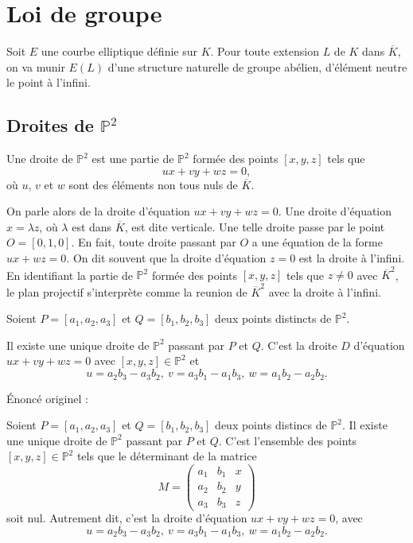 \chapter{Loi de groupe}

Soit $E$ une courbe elliptique définie sur $K$. Pour toute extension $L$ de $K$ dans $\overline{K}$, on va munir $E(L)$ d'une structure naturelle de groupe abélien, d'élément neutre le point à l'infini.

\section{Droites de $\mathbb{P}^2$}

\begin{definition}
    Une droite de $\mathbb{P}^2$ est une partie de $\mathbb{P}^2$ formée des points $[x,y,z]$ tels que 
    \[
    ux+vy+wz=0
    ,\] 
    où $u$, $v$ et $w$ sont des éléments non tous nuls de $\overline{K}$.
\end{definition}

On parle alors de la droite d'équation $ux+vy+wz=0$. Une droite d'équation $x=\lambda z$, où $\lambda$ est dans $\overline{K}$, est dite verticale. Une telle droite passe par le point $O = [0,1,0]$. En fait, toute droite passant par $O$ a une équation de la forme $ux+wz=0$. On dit souvent que la droite d'équation $z=0$ est la droite à l'infini. En identifiant la partie de $\mathbb{P}^2$ formée des points $[x,y,z]$ tels que $z \neq 0$ avec $\overline{K}^2$, le plan projectif s'interprète
comme la reunion de $\overline{K}^2$ avec la droite à l'infini.
\begin{lemme}
    \label{lem:lemme2}
    
    Soient $P = \left[ a_1, a_2, a_3 \right]$ et $Q = \left[ b_1, b_2, b_3 \right]$ deux points distincts de $\mathbb{P}^2$.

    Il existe une unique droite de $\mathbb{P}^2$ passant par $P$ et $Q$. C'est la droite $D$ d'équation $ux + vy + wz = 0$ avec $\left[ x, y, z \right] \in \mathbb{P}^2$ et 
    \[
    u = a_2 b_3 - a_3 b_2, \ v = a_3 b_1 - a_1 b_3, \ w = a_1 b_2 - a_2 b_2 
    .\] 

    Énoncé originel : 

    Soient $P = \left[ a_1, a_2, a_3 \right]$ et $Q = \left[ b_1, b_2, b_3 \right]$ deux points distincs de $\mathbb{P}^2$. Il existe une unique droite de $\mathbb{P}^2$ passant par $P$ et $Q$. C'est l'ensemble des points $\left[ x, y, z \right] \in \mathbb{P}^2$ tels que le déterminant de la matrice
    \[
        M = 
    \begin{pmatrix}
        a_1 & b_1 & x \\ 
        a_2 & b_2 & y \\
        a_3 & b_3 & z
    \end{pmatrix}
    \] 
    soit nul. Autrement dit, c'est la droite d'équation $ux + vy + wz = 0$, avec
    \[
    u = a_2b_3 - a_3b_2, \ v = a_3b_1 - a_1b_3, \ w = a_1b_2 - a_2b_2
    .\] 
\end{lemme}

